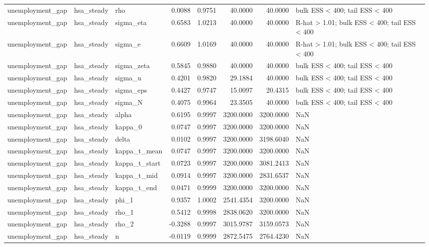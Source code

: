 \begin{tabular}{lllrrrrl}
unemployment\_gap & hsa\_steady & rho & 0.0088 & 0.9751 & 40.0000 & 40.0000 & bulk ESS < 400; tail ESS < 400 \\
unemployment\_gap & hsa\_steady & sigma\_eta & 0.6583 & 1.0213 & 40.0000 & 40.0000 & R-hat > 1.01; bulk ESS < 400; tail ESS < 400 \\
unemployment\_gap & hsa\_steady & sigma\_e & 0.6609 & 1.0169 & 40.0000 & 40.0000 & R-hat > 1.01; bulk ESS < 400; tail ESS < 400 \\
unemployment\_gap & hsa\_steady & sigma\_zeta & 0.5845 & 0.9880 & 40.0000 & 40.0000 & bulk ESS < 400; tail ESS < 400 \\
unemployment\_gap & hsa\_steady & sigma\_u & 0.4201 & 0.9820 & 29.1884 & 40.0000 & bulk ESS < 400; tail ESS < 400 \\
unemployment\_gap & hsa\_steady & sigma\_eps & 0.4427 & 0.9747 & 15.0097 & 20.4315 & bulk ESS < 400; tail ESS < 400 \\
unemployment\_gap & hsa\_steady & sigma\_N & 0.4075 & 0.9964 & 23.3505 & 40.0000 & bulk ESS < 400; tail ESS < 400 \\
unemployment\_gap & hsa\_steady & alpha & 0.6195 & 0.9997 & 3200.0000 & 3200.0000 & NaN \\
unemployment\_gap & hsa\_steady & kappa\_0 & 0.0747 & 0.9997 & 3200.0000 & 3200.0000 & NaN \\
unemployment\_gap & hsa\_steady & delta & 0.0102 & 0.9997 & 3200.0000 & 3198.6040 & NaN \\
unemployment\_gap & hsa\_steady & kappa\_t\_mean & 0.0747 & 0.9997 & 3200.0000 & 3200.0000 & NaN \\
unemployment\_gap & hsa\_steady & kappa\_t\_start & 0.0723 & 0.9997 & 3200.0000 & 3081.2413 & NaN \\
unemployment\_gap & hsa\_steady & kappa\_t\_mid & 0.0914 & 0.9997 & 3200.0000 & 2831.6537 & NaN \\
unemployment\_gap & hsa\_steady & kappa\_t\_end & 0.0471 & 0.9999 & 3200.0000 & 3200.0000 & NaN \\
unemployment\_gap & hsa\_steady & phi\_1 & 0.9357 & 1.0002 & 2541.4354 & 3200.0000 & NaN \\
unemployment\_gap & hsa\_steady & rho\_1 & 0.5412 & 0.9998 & 2838.0620 & 3200.0000 & NaN \\
unemployment\_gap & hsa\_steady & rho\_2 & -0.3288 & 0.9997 & 3015.9787 & 3159.0573 & NaN \\
unemployment\_gap & hsa\_steady & n & -0.0119 & 0.9999 & 2872.5475 & 2764.4230 & NaN \\

\end{tabular}
